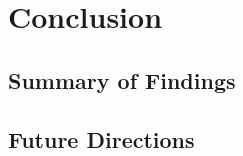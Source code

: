 
\section{Conclusion}

\subsection{Summary of Findings}
\lipsum[63-64]

\subsection{Future Directions}
\lipsum[65]

